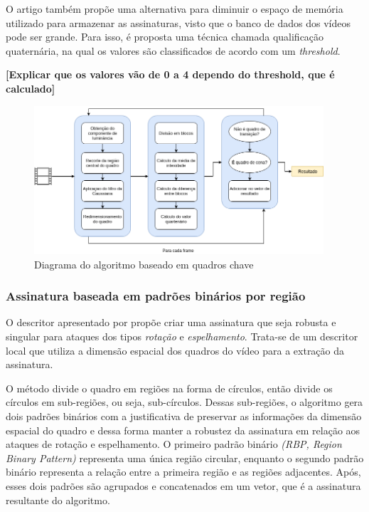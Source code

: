 O artigo também propõe uma alternativa para diminuir o espaço de memória utilizado para armazenar as assinaturas, visto que o banco de dados dos vídeos pode ser grande. Para isso, é proposta uma técnica chamada qualificação quaternária, na qual os valores são classificados de acordo com um \textit{threshold}.

\textbf{[Explicar que os valores vão de 0 a 4 dependo do threshold, que é calculado]}

 \begin{figure}[h]
      \centering
      \includegraphics[width=0.96\textwidth]{dados/figuras/SceneFrame.png}
      \caption{Diagrama do algoritmo baseado em quadros chave}
       	\label{fig:dia_sceneframe}
    \end{figure}  

%
\subsubsection{Assinatura baseada em padrões binários por região}


O descritor apresentado por \citeauthor{kim2014rotation} propõe criar uma assinatura que seja robusta e singular para ataques dos tipos \textit{rotação} e \textit{espelhamento}. Trata-se de um descritor local que utiliza a dimensão espacial dos quadros do vídeo para a extração da assinatura. 

O método divide o quadro em regiões na forma de círculos, então divide os círculos em sub-regiões, ou seja, sub-círculos. Dessas sub-regiões, o algoritmo gera dois padrões binários com a justificativa de preservar as informações da dimensão espacial do quadro e dessa forma manter a robustez da assinatura em relação aos ataques de rotação e espelhamento. O  primeiro padrão binário  \textit{(RBP, Region Binary Pattern)} representa uma única região circular, enquanto o segundo padrão binário representa a relação entre a primeira região e as regiões adjacentes. Após, esses dois padrões são agrupados e concatenados em um vetor, que é a assinatura resultante do algoritmo.

